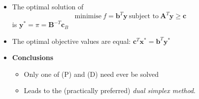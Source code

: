 \documentclass[11pt,a4paper]{article}
\begin{document}
\begin{itemize}
    \item The optimal solution of
        \[
            \text{minimise} \ f =
            \textbf{b}^T\textbf{y} \ \text{subject to} \ \textbf{A}^T\textbf{y} \geq \textbf{c}
        \]
        is $\textbf{y}^* = \pi = \textbf{B}^{-T}\textbf{c}_B$

    \item The optimal objective values are equal:
        $\textbf{c}^T\textbf{x}^* = \textbf{b}^T\textbf{y}^*$

    \item \textbf{Conclusions}
        \begin{itemize}
            \item Only one of (P) and (D) need ever be solved
            \item Leads to the (practically preferred) \emph{dual simplex method}.
        \end{itemize}

\end{itemize}
\end{document}
